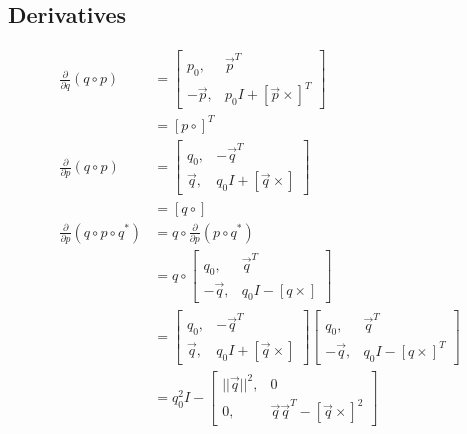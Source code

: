 \documentclass[11pt]{article}
\begin{document}
\subsection{Derivatives}
\begin{align}
	\frac{\partial}{\partial q}(q \circ p) &=
	\begin{bmatrix}
		p_0,    & \vec p^T\\
		-\vec p, & p_0 I + [\vec p\times]^T
 	\end{bmatrix}\\
 	&= [p\circ]^T\\
	\frac{\partial}{\partial p}(q \circ p) &=
	\begin{bmatrix}
		q_0,    & -\vec q^T\\
		\vec q, & q_0 I + [\vec q\times]
 	\end{bmatrix}\\
 	&= [q\circ]\\
 	\frac{\partial}{\partial p}(q \circ p \circ q^*) &= q \circ \frac{\partial}{\partial p}(p \circ q^*)\\
 	&= q \circ
 	\begin{bmatrix}
		q_0,     & \vec q^T\\
		-\vec q, & q_0 I - [q\times]
 	\end{bmatrix}\\
 	&=
 	\begin{bmatrix}
		q_0, & -\vec q^T\\
		\vec q, & q_0I + [\vec q\times] 
	\end{bmatrix}
	\begin{bmatrix}
		q_0,     & \vec q^T\\
		-\vec q, & q_0 I - [q\times]^T
 	\end{bmatrix}\\
 	&= q_0^2I -
 	\begin{bmatrix}
 		||\vec q||^2,& 0\\
 		0,& \vec q \vec q^T - [\vec q \times]^2
 	\end{bmatrix}
\end{align}


\end{document}
